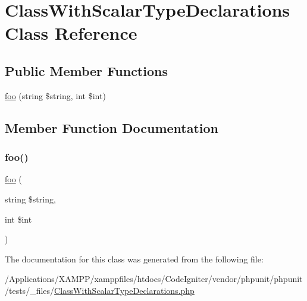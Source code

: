 \hypertarget{class_class_with_scalar_type_declarations}{}\section{Class\+With\+Scalar\+Type\+Declarations Class Reference}
\label{class_class_with_scalar_type_declarations}
\subsection*{Public Member Functions}
\begin{DoxyCompactItemize}
\item 
\mbox{\hyperlink{class_class_with_scalar_type_declarations_af2faad2d29bec41ebe90a6784d64b4d6}{foo}} (string \$string, int \$int)
\end{DoxyCompactItemize}


\subsection{Member Function Documentation}
\mbox{\label{class_class_with_scalar_type_declarations_af2faad2d29bec41ebe90a6784d64b4d6}} 
\subsubsection{\texorpdfstring{foo()}{foo()}}
{\footnotesize\ttfamily \mbox{\hyperlink{interfacefoo}{foo}} (\begin{DoxyParamCaption}\item[{string}]{\$string,  }\item[{int}]{\$int }\end{DoxyParamCaption})}



The documentation for this class was generated from the following file\+:\begin{DoxyCompactItemize}
\item 
/\+Applications/\+X\+A\+M\+P\+P/xamppfiles/htdocs/\+Code\+Igniter/vendor/phpunit/phpunit/tests/\+\_\+files/\mbox{\hyperlink{_class_with_scalar_type_declarations_8php}{Class\+With\+Scalar\+Type\+Declarations.\+php}}\end{DoxyCompactItemize}
